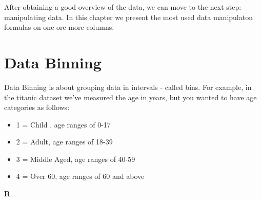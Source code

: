 \documentclass[12pt,]{book}
\newenvironment{Shaded}{\begin{snugshade}}{\end{snugshade}}
\newcommand{\KeywordTok}[1]{\textcolor[rgb]{0.13,0.29,0.53}{\textbf{#1}}}
\newcommand{\DataTypeTok}[1]{\textcolor[rgb]{0.13,0.29,0.53}{#1}}
\newcommand{\DecValTok}[1]{\textcolor[rgb]{0.00,0.00,0.81}{#1}}
\newcommand{\StringTok}[1]{\textcolor[rgb]{0.31,0.60,0.02}{#1}}
\newcommand{\CommentTok}[1]{\textcolor[rgb]{0.56,0.35,0.01}{\textit{#1}}}
\newcommand{\OtherTok}[1]{\textcolor[rgb]{0.56,0.35,0.01}{#1}}
\newcommand{\OperatorTok}[1]{\textcolor[rgb]{0.81,0.36,0.00}{\textbf{#1}}}
\newcommand{\NormalTok}[1]{#1}
\providecommand{\tightlist}{%
  \setlength{\itemsep}{0pt}\setlength{\parskip}{0pt}}
\theoremstyle{definition}
\theoremstyle{definition}
\theoremstyle{definition}
\theoremstyle{remark}
\begin{document}
After obtaining a good overview of the data, we can move to the next
step: manipulating data. In this chapter we present the most used data
manipulaton formulas on one ore more columns.

\section{Data Binning}\label{data-binning}

Data Binning is about grouping data in intervals - called bins. For
example, in the titanic dataset we've measured the age in years, but you
wanted to have age categories as follows:

\begin{itemize}
\tightlist
\item
  1 = Child , age ranges of 0-17
\item
  2 = Adult, age ranges of 18-39
\item
  3 = Middle Aged, age ranges of 40-59
\item
  4 = Over 60, age ranges of 60 and above
\end{itemize}

\textbf{R}

\begin{Shaded}
\end{Shaded}
\end{document}
